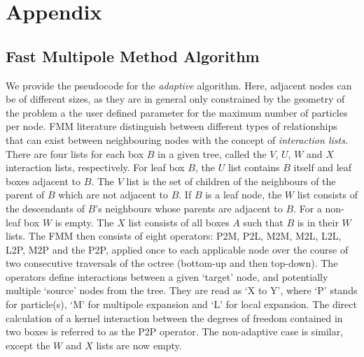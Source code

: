 \chapter{Appendix}

\section{Fast Multipole Method Algorithm}\label{app:a_1_fmm_algorithm}

We provide the pseudocode for the \textit{adaptive} algorithm. Here, adjacent nodes can be of different sizes, as they are in general only constrained by the geometry of the problem a the user defined parameter for the maximum number of particles per node. \gls{FMM} literature distinguish between different types of relationships that can exist between neighbouring nodes with the concept of \textit{interaction lists}. There are four lists for each box $B$ in a given tree, called the $V$, $U$, $W$ and $X$ interaction lists, respectively. For leaf box $B$, the $U$ list contains $B$ itself and leaf boxes adjacent to $B$. The $V$ list is the set of children of the neighbours of the parent of $B$ which are not adjacent to $B$. If $B$ is a leaf node, the $W$ list consists of the descendants of $B$'s neighbours whose parents are adjacent to $B$. For a non-leaf box $W$ is empty. The $X$ list consists of all boxes $A$ such that $B$ is in their $W$ lists. The FMM then consists of eight operators: P2M, P2L, M2M, M2L, L2L, L2P, M2P and the P2P, applied once to each applicable node over the course of two consecutive traversals of the octree (bottom-up and then top-down). The operators define interactions between a given ‘target’ node, and potentially multiple ‘source’ nodes from the tree. They are read as ‘X to Y’, where ‘P’ stands for particle(s), ‘M’ for multipole expansion and ‘L’ for local expansion. The direct calculation of a kernel interaction between the degrees of freedom contained in two boxes is referred to as the P2P operator. The non-adaptive case is similar, except the $W$ and $X$ lists are now empty.


